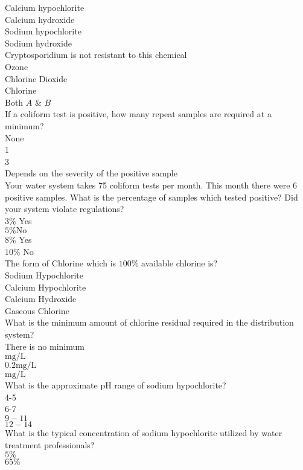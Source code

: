 Calcium hypochlorite\\
Calcium hydroxide\\
Sodium hypochlorite\\
Sodium hydroxide\\
Cryptosporidium is not resistant to this chemical\\
Ozone\\
Chlorine Dioxide\\
Chlorine\\
Both $A$ \& $B$\\
 If a coliform test is positive, how many repeat samples are required at a minimum?\\
None\\
1\\
3\\
Depends on the severity of the positive sample\\
 Your water system takes 75 coliform tests per month. This month there were 6 positive samples. What is the percentage of samples which tested positive? Did your system violate regulations?\\
$3 \%$ Yes\\
$5 \% \mathrm{No}$\\
$8 \%$ Yes\\
$10 \%$ No\\
  The form of Chlorine which is $100 \%$ available chlorine is?\\
Sodium Hypochlorite\\
Calcium Hypochlorite\\
Calcium Hydroxide\\
Gaseous Chlorine\\
 What is the minimum amount of chlorine residual required in the distribution system?\\
There is no minimum\\
$\mathrm{mg} / \mathrm{L}$\\
$0.2 \mathrm{mg} / \mathrm{L}$\\
$\mathrm{mg} / \mathrm{L}$\\
 What is the approximate $\mathrm{pH}$ range of sodium hypochlorite?\\
4-5\\
6-7\\
$9-11$\\
$12-14$\\
 What is the typical concentration of sodium hypochlorite utilized by water treatment professionals?\\
$5 \%$\\
$65 \%$\\

